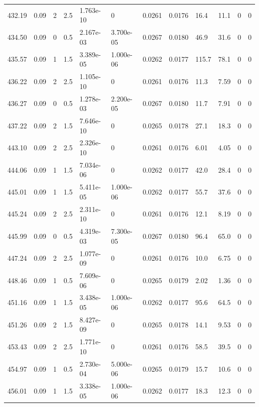 \documentclass[preview]{standalone}
\begin{document}
{{{{{{{{\begin{tabular}{L{1.2cm}C{1.2cm} C{0.3cm}C{0.5cm} C{1.4cm}C{1.4cm} C{1.4cm}C{1.4cm} C{1.6cm}C{1.6cm} C{1.6cm}C{1.6cm}}
  432.19  &  0.09  & 2     & 2.5 &  1.763e-10  & 0  &  0.0261&   0.0176& 16.4 & 11.1   &  0 & 0  \\ 
  434.50  &  0.09  & 0     & 0.5 &  2.167e-03  & 3.700e-05  &  0.0267&   0.0180& 46.9 & 31.6   &  0 & 0  \\ 
  435.57  &  0.09  & 1     & 1.5 &  3.389e-05  & 1.000e-06  &  0.0262&   0.0177& 115.7 & 78.1   &  0 & 0  \\ 
  436.22  &  0.09  & 2     & 2.5 &  1.105e-10  & 0  &  0.0261&   0.0176& 11.3 & 7.59   &  0 & 0  \\ 
  436.27  &  0.09  & 0     & 0.5 &  1.278e-03  & 2.200e-05  &  0.0267&   0.0180& 11.7 & 7.91   &  0 & 0  \\ 
  437.22  &  0.09  & 2     & 1.5 &  7.646e-10  & 0  &  0.0265&   0.0178& 27.1 & 18.3   &  0 & 0  \\ 
  443.10  &  0.09  & 2     & 2.5 &  2.326e-10  & 0  &  0.0261&   0.0176& 6.01 & 4.05   &  0 & 0  \\ 
  444.06  &  0.09  & 1     & 1.5 &  7.034e-06  & 0  &  0.0262&   0.0177& 42.0 & 28.4   &  0 & 0  \\ 
  445.01  &  0.09  & 1     & 1.5 &  5.411e-05  & 1.000e-06  &  0.0262&   0.0177& 55.7 & 37.6   &  0 & 0  \\ 
  445.24  &  0.09  & 2     & 2.5 &  2.311e-10  & 0  &  0.0261&   0.0176& 12.1 & 8.19   &  0 & 0  \\ 
  445.99  &  0.09  & 0     & 0.5 &  4.319e-03  & 7.300e-05  &  0.0267&   0.0180& 96.4 & 65.0   &  0 & 0  \\ 
  447.24  &  0.09  & 2     & 2.5 &  1.077e-09  & 0  &  0.0261&   0.0176& 10.0 & 6.75   &  0 & 0  \\ 
  448.46  &  0.09  & 1     & 0.5 &  7.609e-06  & 0  &  0.0265&   0.0179& 2.02 & 1.36   &  0 & 0  \\ 
  451.16  &  0.09  & 1     & 1.5 &  3.438e-05  & 1.000e-06  &  0.0262&   0.0177& 95.6 & 64.5   &  0 & 0  \\ 
  451.26  &  0.09  & 2     & 1.5 &  8.427e-09  & 0  &  0.0265&   0.0178& 14.1 & 9.53   &  0 & 0  \\ 
  453.43  &  0.09  & 2     & 2.5 &  1.771e-10  & 0  &  0.0261&   0.0176& 58.5 & 39.5   &  0 & 0  \\ 
  454.97  &  0.09  & 1     & 0.5 &  2.730e-04  & 5.000e-06  &  0.0265&   0.0179& 15.7 & 10.6   &  0 & 0  \\ 
  456.01  &  0.09  & 1     & 1.5 &  3.338e-05  & 1.000e-06  &  0.0262&   0.0177& 18.3 & 12.3   &  0 & 0  \\ 

\end{tabular}}}}}}}}}
\end{document}
